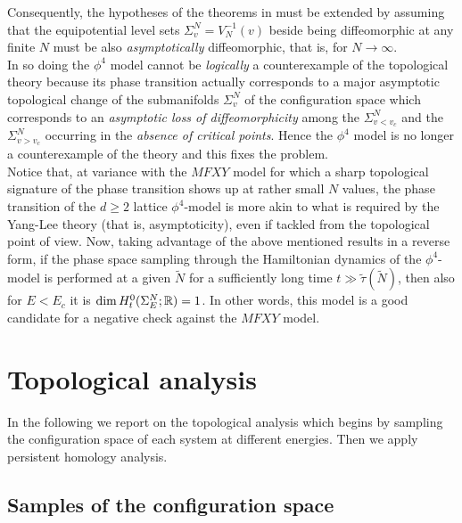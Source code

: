 \documentclass[preprintnumbers,showpacs, showkeys, twocolumn,secnumarabic,amssymb,amsmath,amsfonts,aps, pre]{revtex4-1}
\begin{document}
 Consequently, the hypotheses of the theorems in \cite{TH1,TH2} must be extended by assuming that the equipotential level sets $\Sigma_v^N=V_N^{-1}(v)$ beside being diffeomorphic at any finite $N$ must be also \textit{asymptotically} diffeomorphic, that is, for $N\rightarrow\infty$.\\
In so doing the $\phi^4$ model cannot be {\it logically} a counterexample of the topological theory because its phase transition actually corresponds to a major asymptotic topological change of the submanifolds $\Sigma_v^N$ of the configuration space which corresponds to an {\it asymptotic loss of diffeomorphicity} among the $\Sigma_{v<v_c}^N$ and the $\Sigma_{v>v_c}^N$ occurring in the {\it absence of critical points}.
Hence the $\phi^4$ model is no longer a counterexample of the theory and this fixes the problem.  \\
Notice that, at variance with the $MFXY$ model for which a sharp topological signature of the phase transition shows up at rather small $N$ values, the phase transition of the $d\ge 2$ lattice $\phi^4$-model is more akin to what is required by the Yang-Lee theory (that is, asymptoticity), even if tackled from the topological point of view.  
Now, taking advantage of the above mentioned results in a reverse form, if the phase space sampling through the Hamiltonian dynamics of the $\phi^4$-model is performed at a given $\widetilde{N}$ for a sufficiently long time $t \gg \tilde{\tau}(\widetilde{N})$, then also for $E<E_c$ it is 
$\dim H_t^0(\Sigma^N_E;{\Bbb R}) = 1$. In other words, this model is a good candidate for a negative check against the $MFXY$ model.


\section{Topological analysis}\label{phom}
In the following we report on  the topological analysis which begins by sampling  the configuration space of each system at different energies. Then  we apply persistent homology analysis.

\subsection{Samples of the configuration space}
\end{document}
